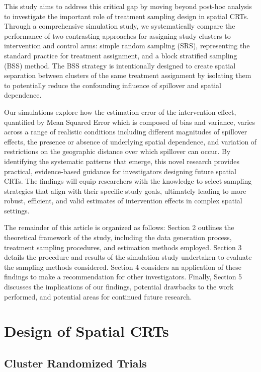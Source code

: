 \documentclass{article}[11pt]
\begin{document}
This study aims to address this critical gap by moving beyond post-hoc analysis to investigate the important role of treatment sampling design in spatial CRTs. Through a comprehensive simulation study, we systematically compare the performance of two contrasting approaches for assigning study clusters to intervention and control arms: simple random sampling (SRS), representing the standard practice for treatment assignment, and a block stratified sampling (BSS) method. The BSS strategy is intentionally designed to create spatial separation between clusters of the same treatment assignment by isolating them to potentially reduce the confounding influence of spillover and spatial dependence.

Our simulations explore how the estimation error of the intervention effect, quantified by Mean Squared Error which is composed of bias and variance, varies across a range of realistic conditions including different magnitudes of spillover effects, the presence or absence of underlying spatial dependence, and variation of restrictions on the geographic distance over which spillover can occur. By identifying the systematic patterns that emerge, this novel research provides practical, evidence-based guidance for investigators designing future spatial CRTs. The findings will equip researchers with the knowledge to select sampling strategies that align with their specific study goals, ultimately leading to more robust, efficient, and valid estimates of intervention effects in complex spatial settings.

The remainder of this article is organized as follows: Section 2 outlines the theoretical framework of the study, including the data generation process, treatment sampling procedures, and estimation methods employed. Section 3 details the procedure and results of the simulation study undertaken to evaluate the sampling methods considered. Section 4 considers an application of these findings to make a recommendation for other investigators. Finally, Section 5 discusses the implications of our findings, potential drawbacks to the work performed, and potential areas for continued future research.

\section{Design of Spatial CRTs}

\subsection{Cluster Randomized Trials}
\end{document}

